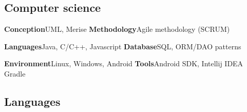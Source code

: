 \subsection{Computer science}
\cvdoubleitem
	{\textbf{Conception}}{UML, Merise}
	{\textbf{Methodology}}{Agile methodology (SCRUM)}

	
\cvdoubleitem
	{\textbf{Languages}}{Java, C/C++, Javascript}
	{\textbf{Database}}{SQL, ORM/DAO patterns}

\cvdoubleitem
	{\textbf{Environment}}{Linux, Windows, Android}
	{\textbf{Tools}}{Android SDK, Intellij IDEA\\ Gradle}

\subsection{Languages}
